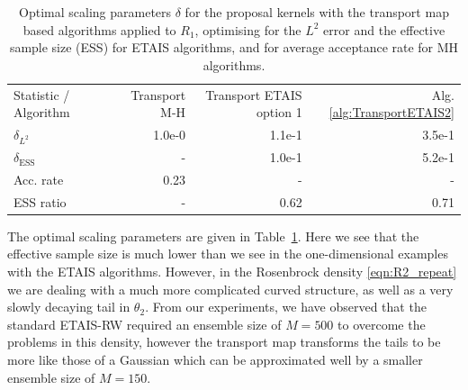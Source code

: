 \documentclass[final]{siamltex}
\newcommand{\edit}[1]{{\color{red} #1}}
\begin{document}
\begin{table}[!ht]
\centering
\begin{tabular}{lrrr}
\toprule
	Statistic \quad / \quad Algorithm & Transport M-H &
                                                           Transport
                                                            ETAIS
                                                            option 1 & Alg. \ref{alg:TransportETAIS2}  \\ \cmidrule(lr){1-4}
	$\delta_{L^2}$				 & 1.0e-0 & 1.1e-1 & 3.5e-1 \\
	$\delta_{\text{ESS}}$				 & - & 1.0e-1 & 5.2e-1 \\ \cmidrule(lr){1-4}
	Acc. rate							 & 0.23 & - & - \\
	ESS ratio							 & - & 0.62 & 0.71 \\
\bottomrule
\end{tabular}
\caption{Optimal scaling parameters \edit{$\delta$ for the proposal
    kernels with the} transport map based
  algorithms applied to $R_1$, optimising for the $L^2$ error and
  the effective sample size (ESS) for ETAIS algorithms, and for average
  acceptance rate for MH algorithms.}
\label{tab:R2_opt_scaling}
\end{table}

The optimal scaling parameters are given in
Table~\ref{tab:R2_opt_scaling}. Here we see that the effective sample
size is much lower than we see in the one-dimensional examples with
the ETAIS algorithms. However, in the Rosenbrock density
\eqref{eqn:R2_repeat} we are dealing with a much more complicated
curved structure, as well as a very slowly decaying tail in
$\theta_2$. From our experiments, we have observed that the standard ETAIS-RW required an ensemble size of $M=500$ to overcome the problems in this density, however the transport map transforms the tails to be more like those of a Gaussian which can be approximated well by a smaller ensemble size of $M=150$.
\end{document}
